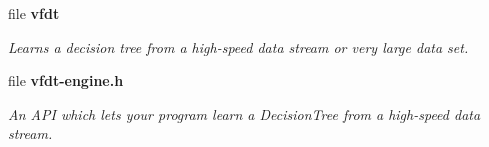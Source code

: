 \begin{CompactItemize}
\item 
file {\bf vfdt}
\begin{CompactList}\small\item\em Learns a decision tree from a high-speed data stream or very large data set. \item\end{CompactList}

\item 
file {\bf vfdt-engine.h}
\begin{CompactList}\small\item\em An API which lets your program learn a Decision\-Tree from a high-speed data stream. \item\end{CompactList}

\end{CompactItemize}
